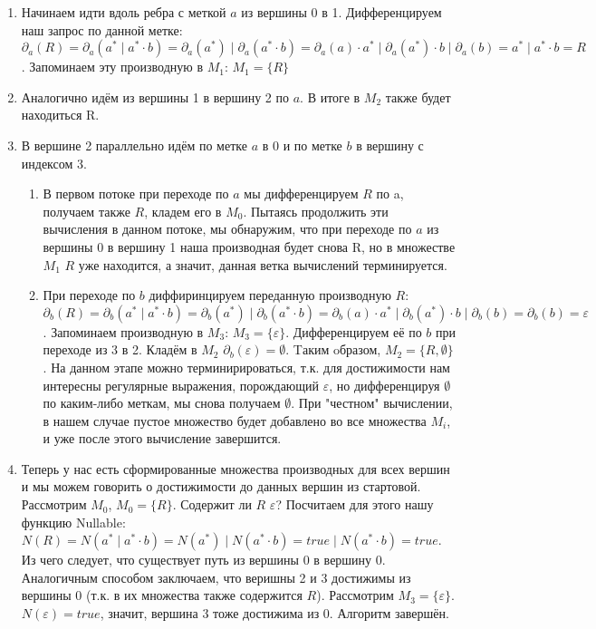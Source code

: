 \begin{example}
\begin{enumerate}
    \item Начинаем идти вдоль ребра с меткой $a$ из вершины 0 в 1. Дифференцируем наш запрос по данной метке: $\partial_{a}(R) = \partial_{a}(a^* \mid a^* \cdot b) = \partial_{a}(a^*) \mid \partial_{a}(a^* \cdot b) = \partial_{a}(a) \cdot a^* \mid \partial_{a}(a^*) \cdot b \mid \partial_{a}(b) = a^* \mid a^* \cdot b = R$. Запоминаем эту производную в $M_{1}$:  $M_{1} = \{R\}$ 
    \item Аналогично идём из вершины 1 в вершину 2 по $a$. В итоге в $M_{2}$ также будет находиться R.
    \item В вершине 2 параллельно идём по метке $a$ в 0 и по метке $b$ в вершину с индексом 3. 
    \begin{enumerate}
        \item В первом потоке при переходе по $a$ мы дифференцируем $R$ по a, получаем также $R$, кладем его в $M_{0}$. Пытаясь продолжить эти вычисления в данном потоке, мы обнаружим, что при переходе по $a$ из вершины 0 в вершину 1 наша производная будет снова R, но в множестве $M_{1}$ $R$ уже находится, а значит, данная ветка вычислений терминируется.
        \item При переходе по $b$ диффиринцируем переданную производную $R$: $\partial_{b}(R) = \partial_{b}(a^* \mid a^* \cdot b) = \partial_{b}(a^*) \mid \partial_{b}(a^* \cdot b) = \partial_{b}(a) \cdot a^* \mid \partial_{b}(a^*) \cdot b \mid \partial_{b}(b) = \partial_{b}(b) = \varepsilon$. Запоминаем производную в $M_{3}$:  $M_{3} = \{\varepsilon\}$. Дифференцируем её по $b$ при переходе из 3 в 2. Кладём в $M_{2}$ $\partial_{b}(\varepsilon) = \emptyset$. Tаким oбразом, $M_{2} = \{R, \emptyset\}$. На данном этапе можно терминирироваться, т.к. для достижимости нам интересны регулярные выражения, порождающий $\varepsilon$, но дифференцируя $\emptyset$ по каким-либо меткам, мы снова получаем $\emptyset$. При "честном" вычислении, в нашем случае пустое множество будет добавлено во все множества $M_{i}$, и уже после этого вычисление завершится.    
    \end{enumerate}
    \item Теперь у нас есть сформированные множества производных для всех вершин и мы можем говорить о достижимости до данных вершин из стартовой. Рассмотрим $M_{0}$, $M_{0} = \{R\}$. Содержит ли $R$ $\varepsilon$? Посчитаем для этого нашу функцию Nullable: $N(R) = N(a^* \mid a^* \cdot b) = N(a^*) \mid N(a^* \cdot b) = true \mid N(a^* \cdot b) = true$. Из чего следует, что существует путь из вершины 0 в вершину 0. Аналогичным способом заключаем, что веришны 2 и 3 достижимы из вершины 0 (т.к. в их множества также содержится $R$). Рассмотрим $M_{3} = \{\varepsilon\}$. $N(\varepsilon) = true$, значит, вершина  3 тоже достижима из 0. Алгоритм завершён.
\end{enumerate}
\end{example}

